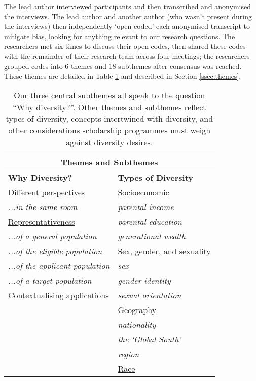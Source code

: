 The lead author interviewed participants and then transcribed and anonymised the interviews. The lead author and another author (who wasn't present during the interviews) then independently `open-coded' each anonymised transcript to mitigate bias, looking for anything relevant to our research questions. The researchers met six times to discuss their open codes, then shared these codes with the remainder of their research team across four meetings; the researchers grouped codes into 6 themes and 18 subthemes after consensus was reached. These themes are detailed in Table \ref{tab:themes} and described in Section \ref{ssec:themes}.

\begin{table}[htbp]
    \centering
    \caption{Our three central subthemes all speak to the question ``Why diversity?''. Other themes and subthemes reflect types of diversity, concepts intertwined with diversity, and other considerations scholarship programmes must weigh against diversity desires.}
    \label{tab:themes}
    \begin{tabular}{|p{}|p{}|}
        \hline
        \multicolumn{2}{|c|}{\textbf{Themes and Subthemes}} \\
        \hline
        \textbf{Why Diversity?} & \textbf{Types of Diversity} \\
        \underline{Different perspectives} & \underline{Socioeconomic} \\
        \emph{...in the same room} & \emph{parental income} \\
        \underline{Representativeness} & \emph{parental education} \\
        \emph{...of a general population} & \emph{generational wealth} \\
        \emph{...of the eligible population} & \underline{Sex, gender, and sexuality} \\
        \emph{...of the applicant population} & \emph{sex} \\
        \emph{...of a target population} & \emph{gender identity} \\
        \underline{Contextualising applications} & \emph{sexual orientation} \\
         & \underline{Geography} \\
         & \emph{nationality} \\
         & \emph{the `Global South'} \\
         & \emph{region} \\
         & \underline{Race} \\

\end{tabular}
\end{table}
